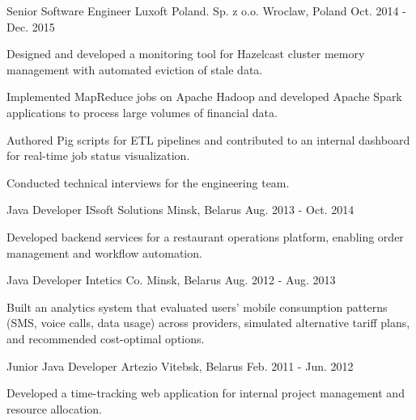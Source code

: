\begin{cventries}
  \cventry
    {Senior Software Engineer} %
    {Luxoft Poland. Sp. z o.o.} %
    {Wroclaw, Poland} %
    {Oct. 2014 - Dec. 2015} %
    {
      \begin{cvitems} %
        \item {Designed and developed a monitoring tool for Hazelcast cluster memory management with automated eviction of stale data.}
        \item {Implemented MapReduce jobs on Apache Hadoop and developed Apache Spark applications to process large volumes of financial data.}
        \item {Authored Pig scripts for ETL pipelines and contributed to an internal dashboard for real-time job status visualization.}
        \item {Conducted technical interviews for the engineering team.}
      \end{cvitems}
    }

  \cventry
    {Java Developer} %
    {ISsoft Solutions} %
    {Minsk, Belarus} %
    {Aug. 2013 - Oct. 2014} %
    {
      \begin{cvitems} %
        \item {Developed backend services for a restaurant operations platform, enabling order management and workflow automation.}
      \end{cvitems}
    }

  \cventry
    {Java Developer} %
    {Intetics Co.} %
    {Minsk, Belarus} %
    {Aug. 2012 - Aug. 2013} %
    {
      \begin{cvitems} %
        \item {Built an analytics system that evaluated users' mobile consumption patterns (SMS, voice calls, data usage) across providers, simulated alternative tariff plans, and recommended cost-optimal options.}
      \end{cvitems}
    }

  \cventry
    {Junior Java Developer} %
    {Artezio} %
    {Vitebsk, Belarus} %
    {Feb. 2011 - Jun. 2012} %
    {
      \begin{cvitems} %
        \item {Developed a time-tracking web application for internal project management and resource allocation.}
      \end{cvitems}
    }

\end{cventries}
